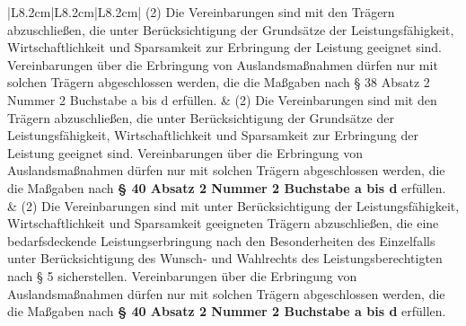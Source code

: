 \documentclass[10pt,a4paper,landscape]{article}
\begin{document}
\begin{longtable}{|L{8.2cm}|L{8.2cm}|L{8.2cm}|}
(2) Die Vereinbarungen sind mit \textcolor{diffred}{den  \newline Trägern abzuschließen, die} unter  \newline Berücksichtigung \textcolor{diffred}{der Grundsätze} der  \newline Leistungsfähigkeit, Wirtschaftlichkeit und  \newline Sparsamkeit \textcolor{diffred}{zur Erbringung der Leistung  \newline geeignet sind.} Vereinbarungen über die  \newline Erbringung von Auslandsmaßnahmen  \newline dürfen nur mit solchen Trägern  \newline abgeschlossen werden, die die Maßgaben  \newline nach \S{} \textcolor{diffred}{38} Absatz 2 Nummer 2 Buchstabe  \newline a bis d erfüllen. & (2) Die Vereinbarungen sind mit \textcolor{diffred}{den  \newline Trägern abzuschließen, die} unter  \newline Berücksichtigung \textcolor{diffred}{der Grundsätze} der  \newline Leistungsfähigkeit, Wirtschaftlichkeit und  \newline Sparsamkeit \textcolor{diffred}{zur Erbringung der Leistung  \newline geeignet sind.} Vereinbarungen über die  \newline Erbringung von Auslandsmaßnahmen  \newline dürfen nur mit solchen Trägern  \newline abgeschlossen werden, die die Maßgaben  \newline nach \textbf{\S{} 40 Absatz 2 Nummer 2  \newline Buchstabe a bis d} erfüllen. & (2) Die Vereinbarungen sind mit unter  \newline Berücksichtigung der Leistungsfähigkeit,  \newline Wirtschaftlichkeit und Sparsamkeit  \newline \textcolor{diffgreen}{geeigneten Trägern abzuschließen, die  \newline eine bedarfsdeckende Leistungserbringung  \newline nach den Besonderheiten des Einzelfalls  \newline unter Berücksichtigung des Wunsch- und  \newline Wahlrechts des Leistungsberechtigten  \newline nach \S{} 5 sicherstellen.} Vereinbarungen  \newline über die Erbringung von  \newline Auslandsmaßnahmen dürfen nur mit  \newline solchen Trägern abgeschlossen werden,  \newline die die Maßgaben nach \textbf{\S{} 40 Absatz 2  \newline Nummer 2 Buchstabe a bis d} erfüllen. \\

\end{longtable}
\end{document}
